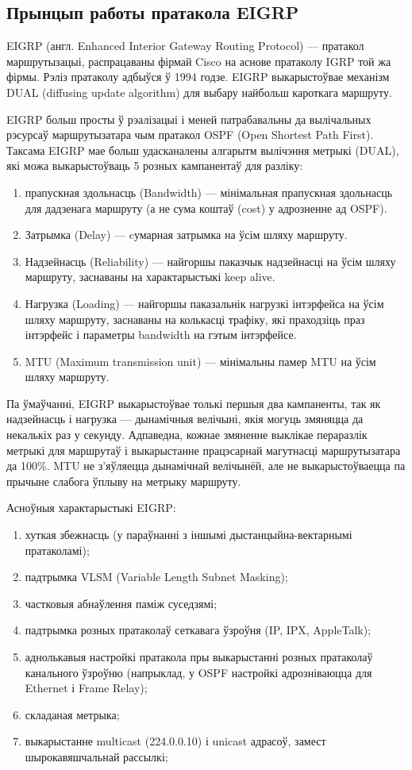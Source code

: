 \subsection{Прынцып работы пратакола EIGRP}

EIGRP (англ. Enhanced Interior Gateway Routing Protocol) --- пратакол маршрутызацыі, распрацаваны фірмай Cisco на аснове пратаколу IGRP той жа фірмы. Рэліз пратаколу адбыўся ў 1994 годзе. EIGRP выкарыстоўвае механізм DUAL (diffusing update algorithm) для выбару найбольш кароткага маршруту.

EIGRP больш просты ў рэалізацыі і меней патрабавальны да вылічальных рэсурсаў маршрутызатара чым пратакол OSPF (Open Shortest Path First). Таксама EIGRP мае больш удасканалены алгарытм вылічэння метрыкі (DUAL), які можа выкарыстоўваць 5 розных кампанентаў для разліку:

\begin{enumerate}
    \item прапускная здольнасць (Bandwidth) --- мінімальная прапускная здольнасць для дадзенага маршруту (а не сума коштаў (cost) у адрозненне ад OSPF).
    \item Затрымка (Delay) --- cумарная затрымка на ўсім шляху маршруту.
    \item Надзейнасць (Reliability) --- найгоршы паказчык надзейнасці на ўсім шляху маршруту, заснаваны на характарыстыкі keep alive.
    \item Нагрузка (Loading) --- найгоршы паказальнік нагрузкі інтэрфейса на ўсім шляху маршруту, заснаваны на колькасці трафіку, які праходзіць праз інтэрфейс і параметры bandwidth на гэтым інтэрфейсе.
    \item MTU (Maximum transmission unit) --- мінімальны памер MTU на ўсім шляху маршруту.
\end{enumerate}

Па ўмаўчанні, EIGRP выкарыстоўвае толькі першыя два кампаненты, так як надзейнасць і нагрузка --- дынамічныя велічыні, якія могуць змяняцца да некалькіх раз у секунду. Адпаведна, кожнае змяненне выклікае пераразлік метрыкі для маршрутаў і выкарыстанне працэсарнай магутнасці маршрутызатара да 100\%. MTU не з'яўляецца дынамічнай велічынёй, але не выкарыстоўваецца па прычыне слабога ўплыву на метрыку маршруту.

Асноўныя характарыстыкі EIGRP:
\begin{enumerate}
     \item хуткая збежнасць (у параўнанні з іншымі дыстанцыйна-вектарнымі пратаколамі);
     \item падтрымка VLSM (Variable Length Subnet Masking);
     \item частковыя абнаўлення паміж суседзямі;
     \item падтрымка розных пратаколаў сеткавага ўзроўня (IP, IPX, AppleTalk);
     \item аднолькавыя настройкі пратакола пры выкарыстанні розных пратаколаў канального ўзроўню (напрыклад, у OSPF настройкі адрозніваюцца для Ethernet і Frame Relay);
     \item складаная метрыка;
     \item выкарыстанне multicast (224.0.0.10) і unicast адрасоў, замест шырокавяшчальнай рассылкі;
\end{enumerate}

